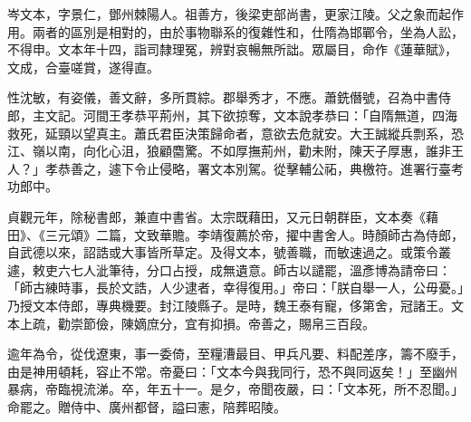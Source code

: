 
\begin{pinyinscope}

 岑文本，字景仁，鄧州棘陽人。祖善方，後梁吏部尚書，更家江陵。父之象而起作用。兩者的區別是相對的，由於事物聯系的復雜性和，仕隋為邯鄲令，坐為人訟，不得申。文本年十四，詣司隸理冤，辨對哀暢無所詘。眾屬目，命作《蓮華賦》，文成，合臺嗟賞，遂得直。



 性沈敏，有姿儀，善文辭，多所貫綜。郡舉秀才，不應。蕭銑僭號，召為中書侍郎，主文記。河間王孝恭平荊州，其下欲掠奪，文本說孝恭曰：「自隋無道，四海救死，延頸以望真主。蕭氏君臣決策歸命者，意欲去危就安。大王誠縱兵剽系，恐江、嶺以南，向化心沮，狼顧麕驚。不如厚撫荊州，勸未附，陳天子厚惠，誰非王人？」孝恭善之，遽下令止侵略，署文本別駕。從擊輔公祏，典檄符。進署行臺考功郎中。



 貞觀元年，除秘書郎，兼直中書省。太宗既藉田，又元日朝群臣，文本奏《藉田》、《三元頌》二篇，文致華贍。李靖復薦於帝，擢中書舍人。時顏師古為侍郎，自武德以來，詔誥或大事皆所草定。及得文本，號善職，而敏速過之。或策令叢遽，敕吏六七人泚筆待，分口占授，成無遺意。師古以譴罷，溫彥博為請帝曰：「師古練時事，長於文誥，人少逮者，幸得復用。」帝曰：「朕自舉一人，公毋憂。」乃授文本侍郎，專典機要。封江陵縣子。是時，魏王泰有寵，侈第舍，冠諸王。文本上疏，勸崇節儉，陳嫡庶分，宜有抑損。帝善之，賜帛三百段。



 逾年為令，從伐遼東，事一委倚，至糧漕最目、甲兵凡要、料配差序，籌不廢手，由是神用頓耗，容止不常。帝憂曰：「文本今與我同行，恐不與同返矣！」至幽州暴病，帝臨視流涕。卒，年五十一。是夕，帝聞夜嚴，曰：「文本死，所不忍聞。」命罷之。贈侍中、廣州都督，謚曰憲，陪葬昭陵。




\end{pinyinscope}
